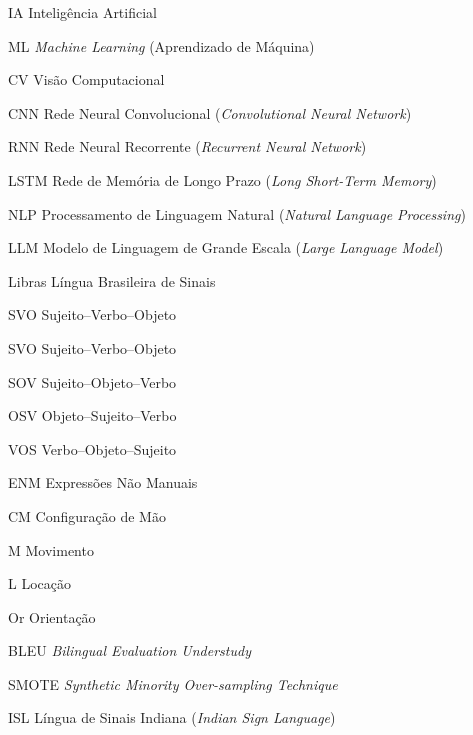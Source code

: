 \documentclass[
    12pt,                %
    openright,           %
    oneside,             %
    a4paper,             %
    english,             %
    brazil               %
]{abntex2}
\begin{document}
\listoffigures*
\cleardoublepage

\listoftables*
\cleardoublepage

\begin{siglas}
    \item[IA]    Inteligência Artificial
    \item[ML]    \textit{Machine Learning} (Aprendizado de Máquina)
    \item[CV]    Visão Computacional
    \item[CNN]   Rede Neural Convolucional (\textit{Convolutional Neural Network})
    \item[RNN]   Rede Neural Recorrente (\textit{Recurrent Neural Network})
    \item[LSTM]  Rede de Memória de Longo Prazo (\textit{Long Short-Term Memory})
    \item[NLP]   Processamento de Linguagem Natural (\textit{Natural Language Processing})
    \item[LLM]   Modelo de Linguagem de Grande Escala (\textit{Large Language Model})
    \item[Libras] Língua Brasileira de Sinais
    \item[SVO]   Sujeito–Verbo–Objeto
    \item[SVO]   Sujeito–Verbo–Objeto
    \item[SOV]   Sujeito–Objeto–Verbo
    \item[OSV]   Objeto–Sujeito–Verbo
    \item[VOS]   Verbo–Objeto–Sujeito
    \item[ENM]   Expressões Não Manuais
    \item[CM]    Configuração de Mão
    \item[M]     Movimento
    \item[L]     Locação
    \item[Or]    Orientação
    \item[BLEU]  \textit{Bilingual Evaluation Understudy}
    \item[SMOTE] \textit{Synthetic Minority Over-sampling Technique}
    \item[ISL]   Língua de Sinais Indiana (\textit{Indian Sign Language})
\end{siglas}
\cleardoublepage
\end{document}
